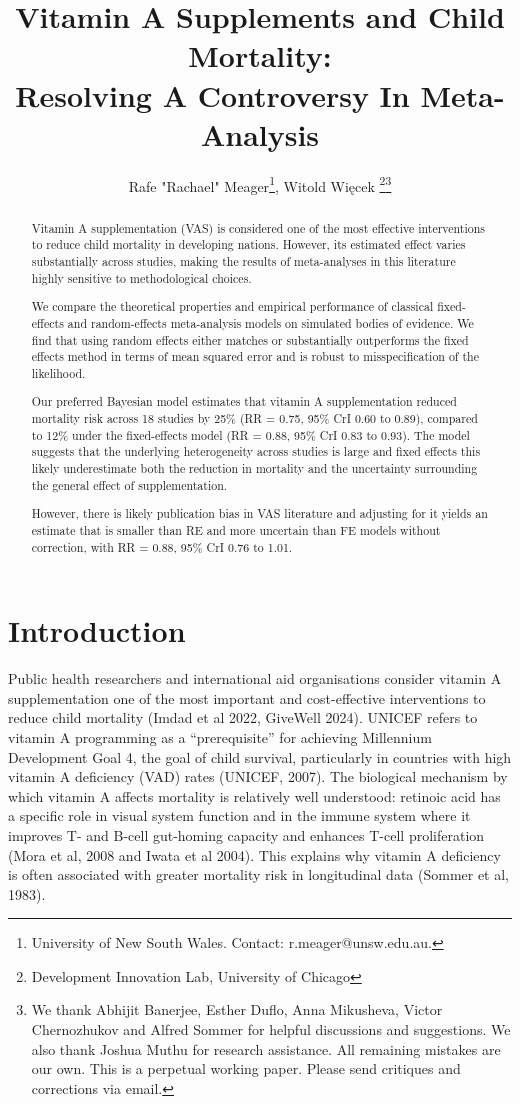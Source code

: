 \documentclass[12pt]{article}
\title{\Large Vitamin A Supplements and Child Mortality:\\ Resolving A Controversy In Meta-Analysis\\
}
\author{Rafe "Rachael" Meager\footnote{University of New South Wales. Contact: r.meager@unsw.edu.au.}, \quad Witold Więcek
\thanks{Development Innovation Lab, University of Chicago}\;\thanks{We thank Abhijit Banerjee, Esther Duflo, Anna Mikusheva, Victor Chernozhukov and Alfred Sommer for helpful discussions and suggestions. We also thank Joshua Muthu for research assistance. All remaining mistakes are our own. This is a perpetual working paper. Please send critiques and corrections via email.}}
\begin{document}
\maketitle

\begin{abstract}
Vitamin A supplementation (VAS) is considered one of the most effective interventions to reduce child mortality in developing nations. However, its estimated effect varies substantially across studies, making the results of meta-analyses in this literature highly sensitive to methodological choices. 

We compare the theoretical properties and empirical performance of classical fixed-effects and random-effects meta-analysis models on simulated bodies of evidence. We find that using random effects either matches or substantially outperforms the fixed effects method in terms of mean squared error and is robust to misspecification of the likelihood. 

Our preferred Bayesian model estimates that vitamin A supplementation reduced mortality risk across 18 studies by 25\% (RR = 0.75, 95\% CrI 0.60 to 0.89), compared to 12\% under the fixed-effects model (RR = 0.88, 95\% CrI 0.83 to 0.93). The model suggests that the underlying heterogeneity across studies is large and fixed effects this likely underestimate both the reduction in mortality and the uncertainty surrounding the general effect of supplementation. 

However, there is likely publication bias in VAS literature and adjusting for it yields an estimate that is smaller than RE and more uncertain than FE models without correction, with RR = 0.88, 95\% CrI 0.76 to 1.01.

\end{abstract}

\section{Introduction}

Public health researchers and international aid organisations consider vitamin A supplementation one of the most important and cost-effective interventions to reduce child mortality (Imdad et al 2022, GiveWell 2024). UNICEF refers to vitamin A programming as a ``prerequisite'' for achieving Millennium Development Goal 4, the goal of child survival, particularly in countries with high vitamin A deficiency (VAD) rates (UNICEF, 2007). The biological mechanism by which vitamin A affects mortality is relatively well understood: retinoic acid has a specific role in visual system function and in the immune system where it improves T- and B-cell gut-homing capacity and enhances T-cell proliferation (Mora et al, 2008 and Iwata et al 2004). This explains why vitamin A deficiency is often associated with greater mortality risk in longitudinal data (Sommer et al, 1983). 
\end{document}
